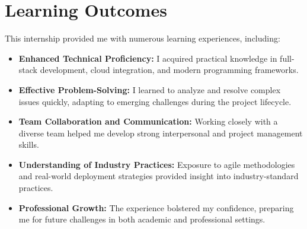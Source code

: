 \section{Learning Outcomes}
This internship provided me with numerous learning experiences, including:
\begin{itemize}
    \item \textbf{Enhanced Technical Proficiency:} I acquired practical knowledge in full-stack development, cloud integration, and modern programming frameworks.
    \item \textbf{Effective Problem-Solving:} I learned to analyze and resolve complex issues quickly, adapting to emerging challenges during the project lifecycle.
    \item \textbf{Team Collaboration and Communication:} Working closely with a diverse team helped me develop strong interpersonal and project management skills.
    \item \textbf{Understanding of Industry Practices:} Exposure to agile methodologies and real-world deployment strategies provided insight into industry-standard practices.
    \item \textbf{Professional Growth:} The experience bolstered my confidence, preparing me for future challenges in both academic and professional settings.
\end{itemize}
